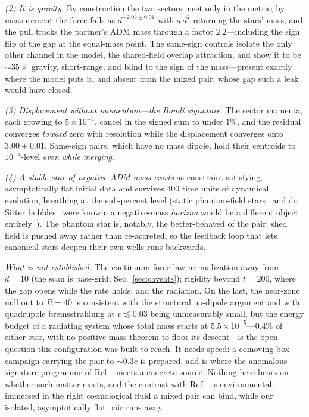 \documentclass[twocolumn,floatfix,aps,prd,nofootinbib]{revtex4-2}
\begin{document}
\emph{(2) It is gravity.} By construction the two sectors meet only in the metric; by measurement the force falls as $d^{-2.03\pm0.01}$ with $a\,d^2$ returning the stars' mass, and the pull tracks the partner's ADM mass through a factor $2.2$---including the sign flip of the gap at the equal-mass point. The same-sign controls isolate the only other channel in the model, the shared-field overlap attraction, and show it to be ${\sim}35\times$ gravity, short-range, and blind to the sign of the mass---present exactly where the model puts it, and absent from the mixed pair, whose gap such a leak would have closed.

\emph{(3) Displacement without momentum---the Bondi signature.} The sector momenta, each growing to $5\times10^{-4}$, cancel in the signed sum to under $1\%$, and the residual converges \emph{toward} zero with resolution while the displacement converges onto $3.00\pm0.01$. Same-sign pairs, which have no mass dipole, hold their centroids to $10^{-4}$-level \emph{even while merging}.

\emph{(4) A stable star of negative ADM mass exists} as constraint-satisfying, asymptotically flat initial data and survives $400$ time units of dynamical evolution, breathing at the sub-percent level (static phantom-field stars~\cite{dzhunushaliev2014} and de Sitter bubbles~\cite{mbarek2014} were known; a negative-mass \emph{horizon} would be a different object entirely~\cite{mann1997}). The phantom star is, notably, the better-behaved of the pair: shed field is pushed away rather than re-accreted, so the feedback loop that lets canonical stars deepen their own wells runs backwards.

\emph{What is not established.} The continuum force-law normalization away from $d=10$ (the scan is base-grid; Sec.~\ref{sec:caveats}); rigidity beyond $t=200$, where the gap opens while the rate holds; and the radiation. On the last, the near-zone null out to $R=40$ is consistent with the structural no-dipole argument and with quadrupole bremsstrahlung at $v\lesssim0.03$ being unmeasurably small, but the energy budget of a radiating system whose total mass starts at $5.5\times10^{-5}$---$0.4\%$ of either star, with no positive-mass theorem to floor its descent---is the open question this configuration was built to reach. It needs speed: a comoving-box campaign carrying the pair to ${\sim}0.3c$ is prepared, and is where the anomalous-signature programme of Ref.~\cite{trivedi_loeb2026} meets a concrete source. Nothing here bears on whether such matter exists, and the contrast with Ref.~\cite{nojiri2026} is environmental: immersed in the right cosmological fluid a mixed pair can bind, while our isolated, asymptotically flat pair runs away.
\end{document}
